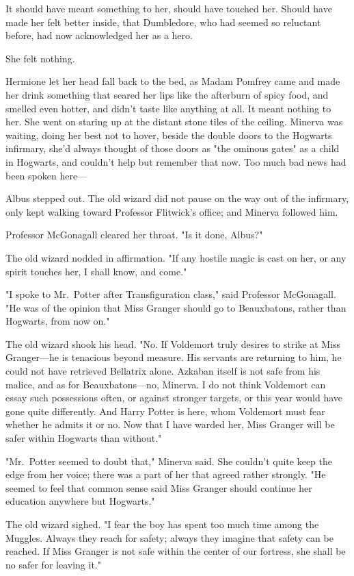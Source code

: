 It should have meant something to her, should have touched her. Should have
made her felt better inside, that Dumbledore, who had seemed so reluctant
before, had now acknowledged her as a hero.

She felt nothing.

Hermione let her head fall back to the bed, as Madam Pomfrey came and made her
drink something that seared her lips like the afterburn of spicy food, and
smelled even hotter, and didn't taste like anything at all. It meant nothing to
her. She went on staring up at the distant stone tiles of the ceiling.
\sbreak
Minerva was waiting, doing her best not to hover, beside the double doors to
the Hogwarts infirmary, she'd always thought of those doors as "the ominous
gates" as a child in Hogwarts, and couldn't help but remember that now. Too
much bad news had been spoken here---

Albus stepped out. The old wizard did not pause on the way out of the
infirmary, only kept walking toward Professor Flitwick's office; and Minerva
followed him.

Professor McGonagall cleared her throat. "Is it done, Albus?"

The old wizard nodded in affirmation. "If any hostile magic is cast on her, or
any spirit touches her, I shall know, and come."

"I spoke to Mr.~Potter after Transfiguration class," said Professor McGonagall.
"He was of the opinion that Miss Granger should go to Beauxbatons, rather than
Hogwarts, from now on."

The old wizard shook his head. "No. If Voldemort truly desires to strike at
Miss Granger---he is tenacious beyond measure. His servants are returning to
him, he could not have retrieved Bellatrix alone. Azkaban itself is not safe
from his malice, and as for Beauxbatons---no, Minerva. I do not think Voldemort
can essay such possessions often, or against stronger targets, or this year
would have gone quite differently. And Harry Potter is here, whom Voldemort
must fear whether he admits it or no. Now that I have warded her, Miss Granger
will be safer within Hogwarts than without."

"Mr.~Potter seemed to doubt that," Minerva said. She couldn't quite keep the
edge from her voice; there was a part of her that agreed rather strongly. "He
seemed to feel that common sense said Miss Granger should continue her
education anywhere but Hogwarts."

The old wizard sighed. "I fear the boy has spent too much time among the
Muggles. Always they reach for safety; always they imagine that safety can be
reached. If Miss Granger is not safe within the center of our fortress, she
shall be no safer for leaving it."

